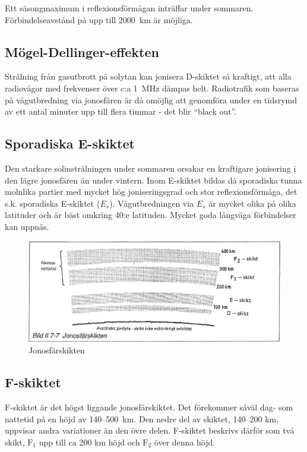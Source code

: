 Ett säsongmaximum i reflexionsförmågan inträffar under
sommaren. Förbindelseavstånd på upp till 2000~km är möjliga.

\subsection{Mögel-Dellinger-effekten}

Strålning från gasutbrott på solytan kan jonisera D-skiktet så
kraftigt, att alla radiovågor med frekvenser över c:a 1~MHz dämpas
helt.  Radiotrafik som baseras på vågutbredning via jonosfären är då
omöjlig att genomföra under en tidsrymd av ett antal minuter upp till
flera timmar - det blir ``black out''.

\subsection{Sporadiska E-skiktet}

Den starkare solinstrålningen under sommaren orsakar en kraftigare
jonisering i den lägre jonosfären än under vintern. Inom E-skiktet
bildas då sporadiska tunna molnlika partier med mycket hög
joniseringsgrad och stor reflexionsförmåga, det s.k. sporadiska
E-skiktet (\(E_s\)). Vågutbredningen via \(E_s\) är mycket olika på
olika latituder och är bäst omkring 40:e latituden. Mycket goda långväga
förbindelser kan uppnås.

\begin{figure}
  \includegraphics[width=\textwidth]{images/bild_2_7-07}
  \caption{Jonosfärskikten}
  \label{fig:bildII7-7}
\end{figure}

\subsection{F-skiktet}

F-skiktet är det högst liggande jonosfärskiktet. Det förekommer såväl
dag- som nattetid på en höjd av 140--500~km. Den nedre del av skiktet,
140--200 km, uppvisar andra variationer än den övre delen. F-skiktet
beskrivs därför som två skikt, \(\mathrm{F_1}\) upp till ca 200 km
höjd och \(\mathrm{F_2}\) över denna höjd.


